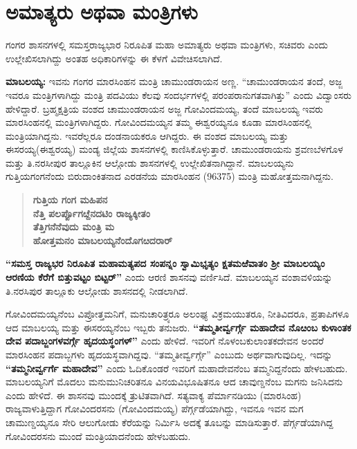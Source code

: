 \section{ಅಮಾತ್ಯರು ಅಥವಾ ಮಂತ್ರಿಗಳು}

ಗಂಗರ ಶಾಸನಗಳಲ್ಲಿ ಸಮಸ್ತರಾಜ್ಯಭಾರ ನಿರೂಪಿತ ಮಹಾ ಅಮಾತ್ಯರು ಅಥವಾ ಮಂತ್ರಿಗಳು, ಸಚಿವರು ಎಂದು ಉಲ್ಲೇಖಿಸಲಾಗಿದ್ದು ಅಂತಹ ಅಧಿಕಾರಿಗಳನ್ನು ಈ ಕೆಳಗೆ ವಿವೇಚಿಸಲಾಗಿದೆ.

\textbf{ಮಾಬಲಯ್ಯ:} ಇವನು ಗಂಗರ ಮಾರಸಿಂಹನ ಮಂತ್ರಿ ಚಾಮುಂಡರಾಯನ ಅಣ್ಣ. “ಚಾಮುಂಡರಾಯನ ತಂದೆ, ಅಜ್ಜ ಇವರೂ ಮಂತ್ರಿಗಳಾಗಿದ್ದು ಮಂತ್ರಿ ಪದವಿಯು ಕೆಲವು ಸಂದರ್ಭಗಳಲ್ಲಿ ಪರಂಪರಾನುಗತವಾಗಿತ್ತು” ಎಂದು ವಿದ್ವಾಂಸರು ಹೇಳಿದ್ದಾರೆ. ಬ್ರಹ್ಮಕ್ಷತ್ರಿಯ ವಂಶದ ಚಾಮುಂಡರಾಯನ ಅಜ್ಜ ಗೋವಿಂದಮಯ್ಯ, ತಂದೆ ಮಾಬಲಯ್ಯ ಇವರು ಮಾರಸಿಂಹನಲ್ಲಿ ಮಂತ್ರಿಗಳಾಗಿದ್ದರು. ಗೋವಿಂದಮಯ್ಯನ ತಮ್ಮ ಈಶ್ವರಯ್ಯನೂ ಕೂಡಾ ಮಾರಸಿಂಹನಲ್ಲಿ ಮಂತ್ರಿಯಾಗಿ\-ದ್ದನು. ಇವರೆಲ್ಲರೂ ದಂಡನಾಯಕರೂ ಆಗಿದ್ದರು. ಈ ವಂಶದ ಮಾಬಲಯ್ಯ ಮತ್ತು ಈಸರಯ್ಯ(ಈಶ್ವರಯ್ಯ) ಮಂಡ್ಯ ಜಿಲ್ಲೆಯ ಶಾಸನಗಳಲ್ಲಿ ಕಾಣಿಸಿಕೊಳ್ಳುತ್ತಾರೆ. ಚಾಮುಂಡರಾಯನು ಶ್ರವಣಬೆಳಗೊಳ ಮತ್ತು ತಿ.ನರಸೀಪುರ ತಾಲ್ಲೂಕಿನ ಆಲ್ಗೋಡು ಶಾಸನಗಳಲ್ಲಿ ಉಲ್ಲೇಖಿತನಾಗಿದ್ದಾನೆ. ಮಾಬಲಯ್ಯನು ಗುತ್ತಿಯಗಂಗನೆಂದು ಬಿರುದಾಂಕಿತನಾದ ಎರಡನೆಯ ಮಾರಸಿಂಹನ (963\enginline{-}75) ಮಂತ್ರಿ ಮಹೋತ್ತಮನಾಗಿದ್ದನು.

\begin{verse}
\textbf{ಗುತ್ತಿಯ ಗಂಗ ಮಹಿಪನ} \\\textbf{ನೆತ್ತಿ ಪಲರ್ಪ್ಪೊಗೞ್ದೆನದಟಿಂ ರಾಜ್ಯಕ್ಕೀತಂ} \\\textbf{ ತೆತ್ತಿಗನೆನೆವುದು ಮಂತ್ರಿ ಮ} \\\textbf{ ಹೋತ್ತಮನಂ ಮಾಬಲಯ್ಯನೆಂದೊಗೞದರಾರ್​}
\end{verse}

\textbf{“ಸಮಸ್ತ ರಾಜ್ಯಭರ ನಿರೂಪಿತ ಮಹಾಮತ್ಯಪದ ಸಂಪನ್ನಂ ಸ್ವಾಮಿಭೃತ್ಯಂ ಕ್ಷತಮಱೆವಾತಂ ಶ‍್ರೀ ಮಾಬಲಯ್ಯಂ ಆರಣಿಯ ಕೆರೆಗೆ ಬಿತ್ತುವಟ್ಟಂ ಬಿಟ್ಟರ್​”} ಎಂದು ಆರಣಿ ಶಾಸನವು ವರ್ಣಿಸಿದೆ. ಮಾಬಲಯ್ಯನ ವಂಶಾವಳಿಯನ್ನು ತಿ.ನರಸಿಪುರ ತಾಲ್ಲೂಕು ಆಲ್ಗೋಡು ಶಾಸನದಲ್ಲಿ ನೀಡಲಾಗಿದೆ.

ಗೋವಿಂದಮಯ್ಯನೆಂಬ ವಿಪ್ರೋತ್ತಮನಿಗೆ, ಮನುಚಾರಿತ್ರ್ಯರೂ ಅಲಂಘ್ಯ ವಿಕ್ರಮಯುತರೂ, ನೀತಿವಿದರೂ, ಪ್ರತಾಪಿಗಳೂ ಆದ ಮಾಬಲಯ್ಯ ಮತ್ತು ಈಸರಯ್ಯನೆಂಬ ಇಬ್ಬರು ತನುಜರು. \textbf{“ತಮ್ಮತೀರ್ವ್ವರ್ಗ್ಗೆ ಮಹಾದೇವ ನೊೞಂಬ ಕುಳಾಂತಕ ದೇವ ಪದಾಬ್ಜಂಗಳವರ್ಗ್ಗೆ ಹೃದಯಸ್ಥಂಗಳ್​”} ಎಂದು ಹೇಳಿದೆ. ಇವರಿಗೆ ನೊಳಂಬಕುಲಾಂತಕದೇವನ ಅಂದರೆ ಮಾರಸಿಂಹನ ಪದಾಬ್ಜಗಳು ಹೃದಯಸ್ಥವಾಗಿದ್ದವು. “ತಮ್ಮತೀರ್ವ್ವರ್ಗ್ಗೆ” ಎಂಬುದು ಅರ್ಥವಾಗುವುದಿಲ್ಲ. ಇದನ್ನು \textbf{“ತಮ್ಮನೀರ್ವ್ವರ್ಗೆ ಮಹಾದೇವ”} ಎಂದು ಓದಿಕೊಂಡರೆ ಇವರಿಗೆ ಮಹಾದೇವನೆಂಬ ತಮ್ಮನಿದ್ದನೆಂದು ಹೇಳಬಹುದು. ಮಾಬಲಯ್ಯನಿಗೆ ಮೊದಲು ಮನುಮುನಿಚರಿತನೂ ವಿನಯವಿಭೂಷಿತನೂ ಆದ ಚಾವುಣ್ಡನೆಂಬ ಮಗನು ಜನಿಸಿದನು ಎಂದು ಹೇಳಿದೆ. ಈ ಶಾಸನವು ಮುಂದಕ್ಕೆ ತ್ರುಟಿತವಾಗಿದೆ. ಸತ್ಯವಾಕ್ಯ ಪೆರ್ಮಾನಡಿಯು (ಮಾರಸಿಂಹ) ರಾಜ್ಯವಾಳುತ್ತಿದ್ದಾಗ ಗೋವಿಂದರಸನು (ಗೋವಿಂದಮಯ್ಯ) ಪೆರ್ಗ್ಗಡೆಯಾಗಿದ್ದು, ಇವನೂ ಇವನ ಮಗ ಚಾಮುಣ್ಡಯ್ಯನೂ ಸೇರಿ ಆಲುಗೋಡು ಕೆರೆಯನ್ನು ನಿರ್ಮಿಸಿ ಅದಕ್ಕೆ ತೂಬನ್ನು ಮಾಡಿಸುತ್ತಾರೆ. ಪೆರ್ಗ್ಗಡೆಯಾಗಿದ್ದ ಗೋವಿಂದರಸನು ಮುಂದೆ ಮಂತ್ರಿಯಾದನೆಂದು ಹೇಳಬಹುದು.

